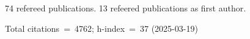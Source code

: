 74 refereed publications. 13 refeered publications as first author.

Total citations~=~4762; h-index~=~37 (2025-03-19)